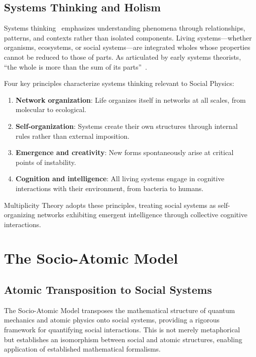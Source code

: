 \documentclass[11pt,a4paper]{article}
\begin{document}
\subsection{Systems Thinking and Holism}

Systems thinking~\cite{capra2014} emphasizes understanding phenomena through relationships, patterns, and contexts rather than isolated components. Living systems—whether organisms, ecosystems, or social systems—are integrated wholes whose properties cannot be reduced to those of parts. As articulated by early systems theorists, ``the whole is more than the sum of its parts''~\cite{bertalanffy1968}.

Four key principles characterize systems thinking relevant to Social Physics:

\begin{enumerate}
    \item \textbf{Network organization}: Life organizes itself in networks at all scales, from molecular to ecological.
    \item \textbf{Self-organization}: Systems create their own structures through internal rules rather than external imposition.
    \item \textbf{Emergence and creativity}: New forms spontaneously arise at critical points of instability.
    \item \textbf{Cognition and intelligence}: All living systems engage in cognitive interactions with their environment, from bacteria to humans.
\end{enumerate}

Multiplicity Theory adopts these principles, treating social systems as self-organizing networks exhibiting emergent intelligence through collective cognitive interactions.

\section{The Socio-Atomic Model}
\label{sec:socioatomic}

\subsection{Atomic Transposition to Social Systems}

The Socio-Atomic Model transposes the mathematical structure of quantum mechanics and atomic physics onto social systems, providing a rigorous framework for quantifying social interactions. This is not merely metaphorical but establishes an isomorphism between social and atomic structures, enabling application of established mathematical formalisms.
\end{document}
